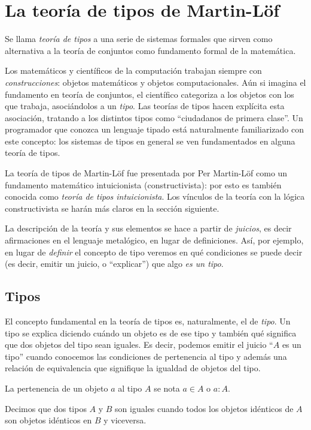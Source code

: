 \documentclass[11pt]{article} %
\begin{document}
\section{La teoría de tipos de Martin-Löf}
Se llama \textit{teoría de tipos} a una serie de sistemas formales que sirven como alternativa a la teoría de conjuntos como fundamento formal de la matemática. 

Los matemáticos y científicos de la computación trabajan siempre con \textit{construcciones}: objetos matemáticos y objetos computacionales. Aún si imagina el fundamento en teoría de conjuntos, el científico categoriza a los objetos con los que trabaja, asociándolos a un \textit{tipo}. Las teorías de tipos hacen explícita esta asociación, tratando a los distintos tipos como ``ciudadanos de primera clase''.  Un programador que conozca un lenguaje tipado está naturalmente familiarizado con este concepto: los sistemas de tipos en general se ven fundamentados en alguna teoría de tipos.

La teoría de tipos de Martin-Löf fue presentada por Per Martin-Löf \cite{martin1984intuitionistic} como un fundamento matemático intuicionista (constructivista): por esto es también conocida como \textit{teoría de tipos intuicionista}. Los vínculos de la teoría con la lógica constructivista se harán más claros en la sección siguiente.

La descripción de la teoría y sus elementos se hace a partir de \textit{juicios}, es decir afirmaciones en el lenguaje metalógico, en lugar de definiciones. Así, por ejemplo, en lugar de \textit{definir} el concepto de tipo veremos en qué condiciones se puede decir (es decir, emitir un juicio, o ``explicar'') que algo \textit{es un tipo}.

\subsection{Tipos}
El concepto fundamental en la teoría de tipos es, naturalmente, el de \textit{tipo}. Un tipo se explica diciendo cuándo un objeto es de ese tipo y también qué significa que dos objetos del tipo sean iguales. Es decir, podemos emitir el juicio ``$A$ es un tipo'' cuando conocemos las condiciones de pertenencia al tipo y además una relación de equivalencia que signifique la igualdad de objetos del tipo.

La pertenencia de un objeto $a$ al tipo $A$ se nota $a \in A$ o $a : A$.

Decimos que dos tipos $A$ y $B$ son iguales cuando todos los objetos idénticos de $A$ son objetos idénticos en $B$ y viceversa. 
\end{document}

